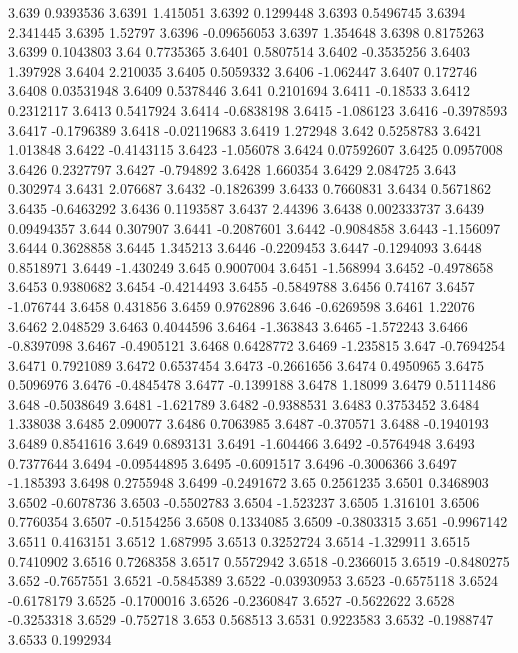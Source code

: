 3.639  0.9393536
3.6391  1.415051
3.6392  0.1299448
3.6393  0.5496745
3.6394  2.341445
3.6395  1.52797
3.6396  -0.09656053
3.6397  1.354648
3.6398  0.8175263
3.6399  0.1043803
3.64  0.7735365
3.6401  0.5807514
3.6402  -0.3535256
3.6403  1.397928
3.6404  2.210035
3.6405  0.5059332
3.6406  -1.062447
3.6407  0.172746
3.6408  0.03531948
3.6409  0.5378446
3.641  0.2101694
3.6411  -0.18533
3.6412  0.2312117
3.6413  0.5417924
3.6414  -0.6838198
3.6415  -1.086123
3.6416  -0.3978593
3.6417  -0.1796389
3.6418  -0.02119683
3.6419  1.272948
3.642  0.5258783
3.6421  1.013848
3.6422  -0.4143115
3.6423  -1.056078
3.6424  0.07592607
3.6425  0.0957008
3.6426  0.2327797
3.6427  -0.794892
3.6428  1.660354
3.6429  2.084725
3.643  0.302974
3.6431  2.076687
3.6432  -0.1826399
3.6433  0.7660831
3.6434  0.5671862
3.6435  -0.6463292
3.6436  0.1193587
3.6437  2.44396
3.6438  0.002333737
3.6439  0.09494357
3.644  0.307907
3.6441  -0.2087601
3.6442  -0.9084858
3.6443  -1.156097
3.6444  0.3628858
3.6445  1.345213
3.6446  -0.2209453
3.6447  -0.1294093
3.6448  0.8518971
3.6449  -1.430249
3.645  0.9007004
3.6451  -1.568994
3.6452  -0.4978658
3.6453  0.9380682
3.6454  -0.4214493
3.6455  -0.5849788
3.6456  0.74167
3.6457  -1.076744
3.6458  0.431856
3.6459  0.9762896
3.646  -0.6269598
3.6461  1.22076
3.6462  2.048529
3.6463  0.4044596
3.6464  -1.363843
3.6465  -1.572243
3.6466  -0.8397098
3.6467  -0.4905121
3.6468  0.6428772
3.6469  -1.235815
3.647  -0.7694254
3.6471  0.7921089
3.6472  0.6537454
3.6473  -0.2661656
3.6474  0.4950965
3.6475  0.5096976
3.6476  -0.4845478
3.6477  -0.1399188
3.6478  1.18099
3.6479  0.5111486
3.648  -0.5038649
3.6481  -1.621789
3.6482  -0.9388531
3.6483  0.3753452
3.6484  1.338038
3.6485  2.090077
3.6486  0.7063985
3.6487  -0.370571
3.6488  -0.1940193
3.6489  0.8541616
3.649  0.6893131
3.6491  -1.604466
3.6492  -0.5764948
3.6493  0.7377644
3.6494  -0.09544895
3.6495  -0.6091517
3.6496  -0.3006366
3.6497  -1.185393
3.6498  0.2755948
3.6499  -0.2491672
3.65  0.2561235
3.6501  0.3468903
3.6502  -0.6078736
3.6503  -0.5502783
3.6504  -1.523237
3.6505  1.316101
3.6506  0.7760354
3.6507  -0.5154256
3.6508  0.1334085
3.6509  -0.3803315
3.651  -0.9967142
3.6511  0.4163151
3.6512  1.687995
3.6513  0.3252724
3.6514  -1.329911
3.6515  0.7410902
3.6516  0.7268358
3.6517  0.5572942
3.6518  -0.2366015
3.6519  -0.8480275
3.652  -0.7657551
3.6521  -0.5845389
3.6522  -0.03930953
3.6523  -0.6575118
3.6524  -0.6178179
3.6525  -0.1700016
3.6526  -0.2360847
3.6527  -0.5622622
3.6528  -0.3253318
3.6529  -0.752718
3.653  0.568513
3.6531  0.9223583
3.6532  -0.1988747
3.6533  0.1992934
